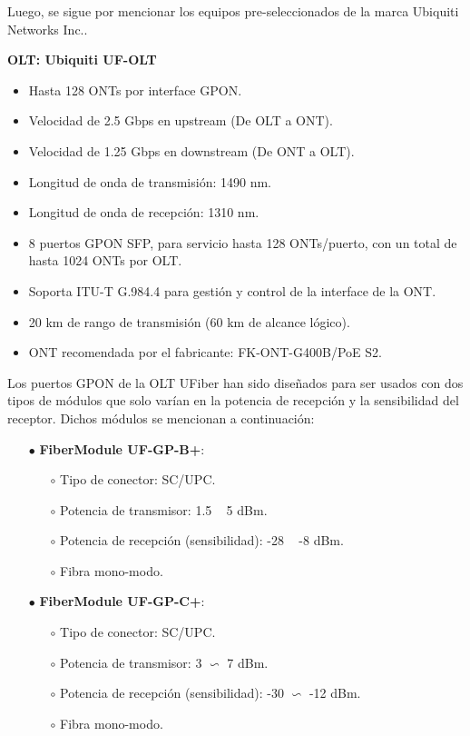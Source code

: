 \documentclass[12pt,a4paper]{book}
\begin{document}
Luego, se sigue por mencionar los equipos pre-seleccionados de la marca Ubiquiti Networks Inc..\bigskip

\textbf{OLT: Ubiquiti UF-OLT}\medskip
\begin{itemize}
\item Hasta 128 ONTs por interface GPON.
\item Velocidad de 2.5 Gbps en upstream (De OLT a ONT).
\item Velocidad de 1.25 Gbps en downstream (De ONT a OLT).
\item Longitud de onda de transmisión: 1490 nm.
\item Longitud de onda de recepción: 1310 nm.
\item 8 puertos GPON SFP, para servicio hasta 128 ONTs/puerto, con un
total de hasta 1024 ONTs por OLT.
\item Soporta ITU-T G.984.4 para gestión y control de la interface de la
ONT.
\item 20 km de rango de transmisión (60 km de alcance lógico).
\item ONT recomendada por el fabricante: FK-ONT-G400B/PoE S2.
\end{itemize}\bigskip

Los puertos GPON de la OLT UFiber han sido diseñados para ser usados
con dos tipos de módulos que solo varían en la potencia de recepción y la
sensibilidad del receptor. Dichos módulos se mencionan a continuación:\bigskip

\begin{itemize}\medskip
\item[$\bullet$] \textbf{FiberModule UF-GP-B+}:
	\begin{itemize}
	\item[$\circ$] Tipo de conector: SC/UPC.
	\item[$\circ$] Potencia de transmisor: 1.5 ~ 5 dBm.
	\item[$\circ$] Potencia de recepción (sensibilidad): -28 ~ -8 dBm.
	\item[$\circ$] Fibra mono-modo.
	\end{itemize}
\item[$\bullet$]\textbf{FiberModule UF-GP-C+}:
	\begin{itemize}
	\item[$\circ$] Tipo de conector: SC/UPC.
	\item[$\circ$] Potencia de transmisor: 3 $\backsim$ 7 dBm.
	\item[$\circ$] Potencia de recepción (sensibilidad): -30 $\backsim$ -12 dBm.
	\item[$\circ$] Fibra mono-modo.
	\end{itemize}
\end{itemize}\bigskip
\end{document}
